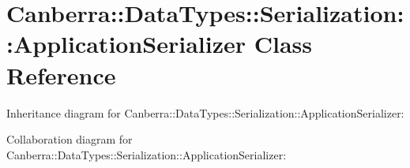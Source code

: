 \hypertarget{class_canberra_1_1_data_types_1_1_serialization_1_1_application_serializer}{}\section{Canberra\+:\+:Data\+Types\+:\+:Serialization\+:\+:Application\+Serializer Class Reference}
\label{class_canberra_1_1_data_types_1_1_serialization_1_1_application_serializer}


Inheritance diagram for Canberra\+:\+:Data\+Types\+:\+:Serialization\+:\+:Application\+Serializer\+:


Collaboration diagram for Canberra\+:\+:Data\+Types\+:\+:Serialization\+:\+:Application\+Serializer\+:
